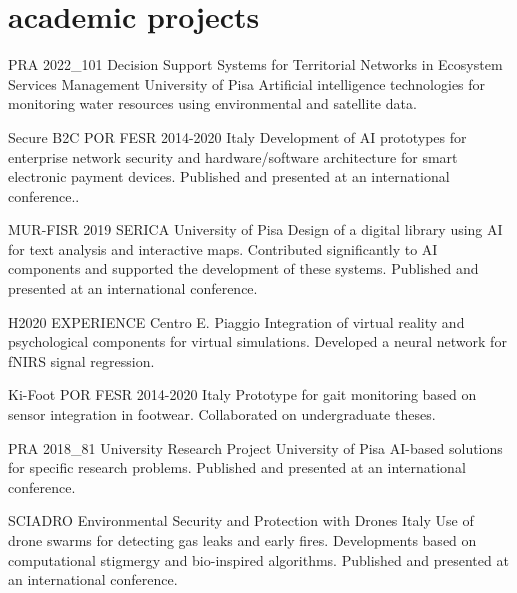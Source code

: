\section{academic projects}
\begin{entrylist}
  
\entry
{PRA 2022\_101}
{Decision Support Systems for Territorial Networks in Ecosystem Services Management}
{University of Pisa}
{Artificial intelligence technologies for monitoring water resources using environmental and satellite data.}

\entry
{Secure B2C}
{POR FESR 2014-2020}
{Italy}
{Development of AI prototypes for enterprise network security and hardware/software architecture for smart electronic payment devices. Published and presented at an international conference..}

\entry
{MUR-FISR 2019}
{SERICA}
{University of Pisa}
{Design of a digital library using AI for text analysis and interactive maps. Contributed significantly to AI components and supported the development of these systems. Published and presented at an international conference.}

\entry
{H2020}
{EXPERIENCE}
{Centro E. Piaggio}
{Integration of virtual reality and psychological components for virtual simulations. Developed a neural network for fNIRS signal regression.}

\entry
{Ki-Foot}
{POR FESR 2014-2020}
{Italy}
{Prototype for gait monitoring based on sensor integration in footwear. Collaborated on undergraduate theses.}

\entry
{PRA 2018\_81}
{University Research Project}
{University of Pisa}
{AI-based solutions for specific research problems. Published and presented at an international conference.}

\entry
{SCIADRO}
{Environmental Security and Protection with Drones}
{Italy}
{Use of drone swarms for detecting gas leaks and early fires. Developments based on computational stigmergy and bio-inspired algorithms. Published and presented at an international conference.}
  
\end{entrylist}

